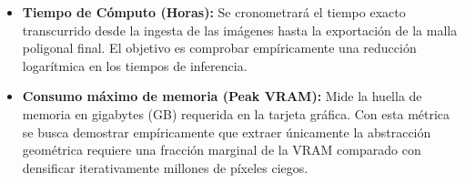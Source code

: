 \begin{itemize}
    \item \textbf{Tiempo de Cómputo (Horas):} Se cronometrará el tiempo exacto transcurrido desde la ingesta de las imágenes hasta la exportación de la malla poligonal final. El objetivo es comprobar empíricamente una reducción logarítmica en los tiempos de inferencia.
    \item \textbf{Consumo máximo de memoria (Peak VRAM):} Mide la huella de memoria en gigabytes (GB) requerida en la tarjeta gráfica. Con esta métrica se busca demostrar empíricamente que extraer únicamente la abstracción geométrica requiere una fracción marginal de la VRAM comparado con densificar iterativamente millones de píxeles ciegos.
\end{itemize}
